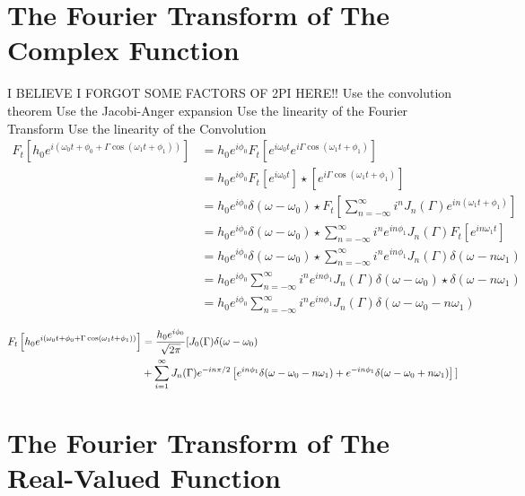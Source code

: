 \documentclass[twocolumn, groupedaddress]{revtex4-1}
\begin{document}
\appendix
\onecolumngrid
\section{The Fourier Transform of The Complex Function}
I BELIEVE I FORGOT SOME FACTORS OF 2PI HERE!!
Use the convolution theorem
Use the Jacobi-Anger expansion
Use the linearity of the Fourier Transform
Use the linearity of the Convolution
\begin{align}
F_t \left[ h_0 e^{i\left( \omega_0 t + \phi_0 + \Gamma \cos( \omega_1 t + \phi_1 ) \right)} \right]
&= h_0 e^{i\phi_0} F_t \left[ e^{i\omega_0 t} e^{i\Gamma \cos(\omega_1 t + \phi_1)} \right]													\\
&= h_0 e^{i\phi_0} F_t \left[ e^{i\omega_0 t} \right] \star \left[ e^{i\Gamma \cos(\omega_1 t + \phi_1)} \right]								\\
&= h_0 e^{i\phi_0} \delta(\omega - \omega_0) \star F_t \left[ \sum_{n=-\infty}^{\infty} i^n J_n(\Gamma) e^{in(\omega_1 t + \phi_1)} \right]		\\
&= h_0 e^{i\phi_0} \delta(\omega - \omega_0) \star \sum_{n=-\infty}^{\infty} i^n e^{in\phi_1} J_n(\Gamma) F_t \left[ e^{in\omega_1 t} \right]	\\
&= h_0 e^{i\phi_0} \delta(\omega - \omega_0) \star \sum_{n=-\infty}^{\infty} i^n e^{in\phi_1} J_n(\Gamma) \delta(\omega - n\omega_1)			\\
&= h_0 e^{i\phi_0} \sum_{n=-\infty}^{\infty} i^n e^{in\phi_1} J_n(\Gamma)  \delta(\omega - \omega_0) \star \delta(\omega - n\omega_1)			\\
&= h_0 e^{i\phi_0} \sum_{n=-\infty}^{\infty} i^n e^{in\phi_1} J_n(\Gamma)  \delta(\omega - \omega_0 - n\omega_1)
\end{align}


\begin{align}
F_t \left[ h_0 e^{i\left( \omega_0 t + \phi_0 + \Gamma \cos( \omega_1 t + \phi_1 ) \right)} \right] 			\nonumber
	&= \frac{h_0 e^{i\phi_0}}{\sqrt{2\pi}} \Huge{[} J_0(\Gamma) \delta(\omega - \omega_0) 					\\
	&+ \sum_{i=1}^{\infty} J_n(\Gamma) e^{-in\pi/2} 
	\left[ e^{in\phi_1} \delta(\omega - \omega_0 - n\omega_1) + e^{-in\phi_1} \delta(\omega - \omega_0 + n\omega_1) \right] \Huge{]}
\end{align}

\section{The Fourier Transform of The Real-Valued Function}
\end{document}
